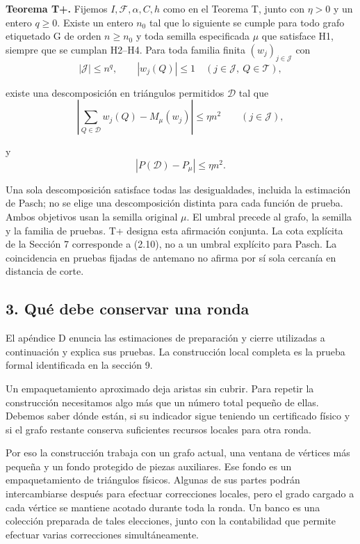 \documentclass[spanish,11pt,a4paper]{article}
\begin{document}
\textbf{Teorema T+.} Fijemos \(I,\mathcal F,\alpha,C,h\) como en el Teorema T, junto con \(\eta>0\) y un entero \(q\geq0\). Existe un entero \(n_0\) tal que lo siguiente se cumple para todo grafo etiquetado G de orden \(n\geq n_0\) y toda semilla especificada \(\mu\) que satisface H1, siempre que se cumplan H2--H4. Para toda familia finita \((w_j)_{j\in\mathcal J}\) con
\[|\mathcal J|\leq n^q,
\qquad |w_j(Q)|\leq1\quad(j\in\mathcal J,\ Q\in\mathcal T),          \tag{2.9}\]

existe una descomposición en triángulos permitidos \(\mathcal D\) tal que
\[\left|\sum_{Q\in\mathcal D}w_j(Q)-M_\mu(w_j)\right|
\leq\eta n^2\qquad(j\in\mathcal J),                                \tag{2.10}\]

y
\[|P(\mathcal D)-P_\mu|\leq\eta n^2.                                \tag{2.11}\]

Una sola descomposición satisface todas las desigualdades, incluida la estimación de Pasch; no se elige una descomposición distinta para cada función de prueba. Ambos objetivos usan la semilla original \(\mu\). El umbral precede al grafo, la semilla y la familia de pruebas. T+ designa esta afirmación conjunta. La cota explícita de la Sección 7 corresponde a (2.10), no a un umbral explícito para Pasch. La coincidencia en pruebas fijadas de antemano no afirma por sí sola cercanía en distancia de corte.

\subsection{3. Qué debe conservar una ronda}\label{quuxe9-debe-conservar-una-ronda}

El apéndice D enuncia las estimaciones de preparación y cierre utilizadas a continuación y explica sus pruebas. La construcción local completa es la prueba formal identificada en la sección 9.

Un empaquetamiento aproximado deja aristas sin cubrir. Para repetir la construcción necesitamos algo más que un número total pequeño de ellas. Debemos saber dónde están, si su indicador sigue teniendo un certificado físico y si el grafo restante conserva suficientes recursos locales para otra ronda.

Por eso la construcción trabaja con un grafo actual, una ventana de vértices más pequeña y un fondo protegido de piezas auxiliares. Ese fondo es un empaquetamiento de triángulos físicos. Algunas de sus partes podrán intercambiarse después para efectuar correcciones locales, pero el grado cargado a cada vértice se mantiene acotado durante toda la ronda. Un banco es una colección preparada de tales elecciones, junto con la contabilidad que permite efectuar varias correcciones simultáneamente.
\end{document}
